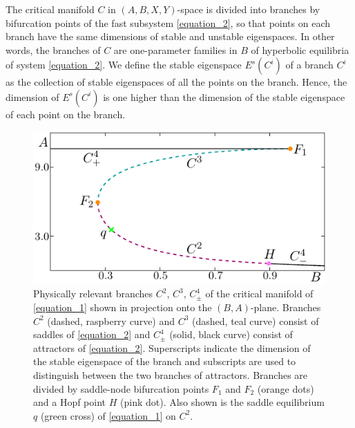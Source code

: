 \documentclass{ws-ijbc}
\begin{document}
The critical manifold $C$ in $(A,B,X,Y)$-space is divided into branches by bifurcation points of the fast subsystem \eqref{equation_2}, so that points on each branch have the same dimensions of stable and unstable eigenspaces.  In other words, the branches of $C$ are one-parameter families in $B$ of hyperbolic equilibria of system \eqref{equation_2}.  We define the stable eigenspace $E^s(C^i)$ of a branch $C^i$ as the collection of stable eigenspaces of all the points on the branch.  Hence, the dimension of $E^s(C^i)$ is one higher than the dimension of the stable eigenspace of each point on the branch. 

\begin{figure}[!t]
\centering
\includegraphics[]{./figures/MKMO_1.pdf}
\caption{Physically relevant branches $C^2$, $C^3$, $C^4_\pm$ of the critical manifold of \eqref{equation_1} shown in projection onto the $(B,A)$-plane.  Branches $C^2$ (dashed, raspberry curve) and $C^3$ (dashed, teal curve) consist of saddles of \eqref{equation_2} and $C^4_\pm$ (solid, black curve) consist of attractors of \eqref{equation_2}.  Superscripts indicate the dimension of the stable eigenspace of the branch and subscripts are used to distinguish between the two branches of attractors.  Branches are divided by saddle-node bifurcation points $F_1$ and $F_2$ (orange dots) and a Hopf point $H$ (pink dot).  Also shown is the saddle equilibrium $q$ (green cross) of \eqref{equation_1} on $C^2$.}
\label{figure_1}
\end{figure}
\end{document}
